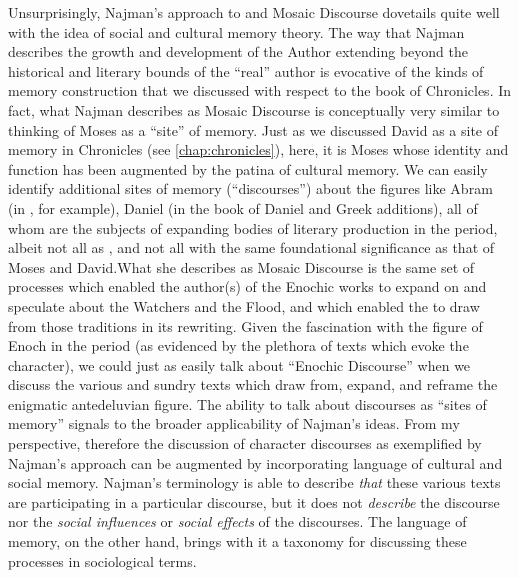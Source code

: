 Unsurprisingly, Najman's approach to \jub and Mosaic Discourse dovetails quite well with the idea of social and cultural memory theory. The way that Najman describes the growth and development of the Author extending beyond the historical and literary bounds of the ``real'' author is evocative of the kinds of memory construction that we discussed with respect to the book of Chronicles. In fact, what Najman describes as Mosaic Discourse is conceptually very similar to thinking of Moses as a ``site'' of memory. Just as we discussed David as a site of memory in Chronicles (see \autoref{chap:chronicles}), here, it is Moses whose identity and function has been augmented by the patina of cultural memory. We can easily identify additional sites of memory (``discourses'') about the figures like Abram (in \ga, for example), Daniel (in the book of Daniel and Greek additions), all of whom are the subjects of expanding bodies of literary production in the \secondtemple period, albeit not all as \psa, and not all with the same foundational significance as that of Moses and David.What she describes as Mosaic Discourse is the same set of processes which enabled the author(s) of the Enochic works to expand on and speculate about the Watchers and the Flood, and which enabled the \ga to draw from those traditions in its rewriting. Given the fascination with the figure of Enoch in the \secondtemple period (as evidenced by the plethora of texts which evoke the character), we could just as easily talk about ``Enochic Discourse'' when we discuss the various and sundry texts which draw from, expand, and reframe the enigmatic antedeluvian figure.
The ability to talk about discourses as ``sites of memory'' signals to the broader applicability of Najman's ideas. From my perspective, therefore the discussion of character discourses as exemplified by Najman's approach can be augmented by incorporating language of cultural and social memory. Najman's terminology is able to describe \emph{that} these various texts are participating in a particular discourse, but it does not \emph{describe} the discourse nor the \emph{social influences} or \emph{social effects} of the discourses. The language of memory, on the other hand, brings with it a taxonomy for discussing these processes in sociological terms.


